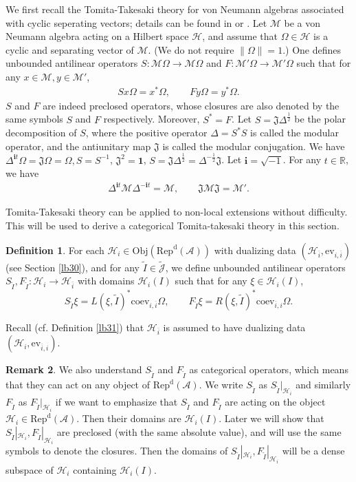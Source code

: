 \documentclass[12pt,a4paper]{article}
\theoremstyle{definition}
\newtheorem{df}{Definition}[section]
\newtheorem{rem}[df]{Remark}
\theoremstyle{plain}
\newcommand{\fk}{\mathfrak}
\newcommand{\mc}{\mathcal}
\newcommand{\wtd}{\widetilde}
\newcommand{\ovl}{\overline}
\newcommand{\id}{\mathbf{1}}
\newcommand{\ev}{\mathrm{ev}}
\newcommand{\coev}{\mathrm{coev}}
\newcommand{\Jtd}{\widetilde{\mathcal J}}
\newcommand{\im}{\mathbf{i}}
\newcommand{\RepdA}{\mathrm{Rep}^{\mathrm d}(\mc A)}
\newcommand{\mbb}{\mathbb}
\newcommand{\Obj}{\mathrm{Obj}}
\numberwithin{equation}{section}
\begin{document}
We first recall the Tomita-Takesaki theory for von Neumann algebras associated with cyclic seperating vectors; details can be found in \cite{Tak02} or \cite{Tak70}. Let $\mc M$ be a von Neumann algebra acting on a Hilbert space $\mc H$, and assume that $\Omega\in\mc H$ is a cyclic and separating vector of $\mc M$. (We do not require $\lVert\Omega\lVert=1$.) One defines unbounded antilinear operators $S:\mc M\Omega\rightarrow\mc M\Omega$ and $F:\mc M'\Omega\rightarrow\mc M'\Omega$ such that for any $x\in\mc M,y\in\mc M'$,
\begin{align*}
Sx\Omega=x^*\Omega,\qquad Fy\Omega=y^*\Omega.
\end{align*}
$S$ and $F$ are indeed preclosed operators, whose closures are also denoted by the same symbols $S$ and $F$ respectively. Moreover, $S^*=F$. Let $S=\fk J\Delta^{\frac 12}$ be the polar decomposition of $S$, where the positive operator $\Delta=S^*S$ is called the modular operator, and the antiunitary map $\fk J$ is called the modular conjugation. We have $\Delta^{\im t}\Omega=\fk J\Omega=\Omega,S=S^{-1}$, $\fk J^2=\id$,  $S=\fk J\Delta^{\frac 12}=\Delta^{-\frac 12}\fk J$. Let $\im=\sqrt{-1}$. For any $t\in\mbb R$, we have
\begin{gather*}
\Delta^{\im t}\mc M\Delta^{-\im t}=\mc M, \qquad \fk J\mc M\fk J=\mc M'.
\end{gather*}


Tomita-Takesaki theory can be applied to non-local extensions without difficulty. This will be used to derive a categorical Tomita-takesaki theory in this section. 

\begin{df}
For each $\mc H_i\in\Obj(\RepdA)$ with dualizing data $(\mc H_{\ovl i},\ev_{i,\ovl i})$ (see Section \ref{lb30}), and for any $\wtd I\in\Jtd$, we define unbounded antilinear operators $S_{\wtd I},F_{\wtd I}:\mc H_i\rightarrow\mc H_{\ovl i}$ with domains $\mc H_i(I)$ such that for any $\xi\in\mc H_i(I)$,
\begin{equation}
	S_{\wtd I}\xi=L(\xi,\wtd I)^*\coev_{i,\ovl i}\Omega,\qquad F_{\wtd I}\xi=R(\xi,\wtd I)^*\coev_{\ovl i,i}\Omega\label{eq12}.
\end{equation}
\end{df}
Recall (cf. Definition \ref{lb31}) that $\mc H_{\ovl i}$ is assumed to have dualizing data $(\mc H_i,\ev_{\ovl i,i})$.




\begin{rem}
We also understand $S_{\wtd I}$ and $F_{\wtd I}$ as categorical operators, which means that they can act on any object of $\RepdA$. We write $S_{\wtd I}$ as $S_{\wtd I}|_{\mc H_i}$ and similarly $F_{\wtd I}$ as $F_{\wtd I}|_{\mc H_i}$ if we want to emphasize that $S_{\wtd I}$ and $F_{\wtd I}$ are acting on the object $\mc H_i\in\RepdA$. Then their domains are $\mc H_i(I)$. Later we will show that $S_{\wtd I}|_{\mc H_i},F_{\wtd I}|_{\mc H_i}$ are preclosed (with the same absolute value), and will use the same symbols to denote the closures. Then the domains of $S_{\wtd I}|_{\mc H_i},F_{\wtd I}|_{\mc H_i}$ will be a dense subspace of $\mc H_i$ containing $\mc H_i(I)$.
\end{rem}
\end{document}
